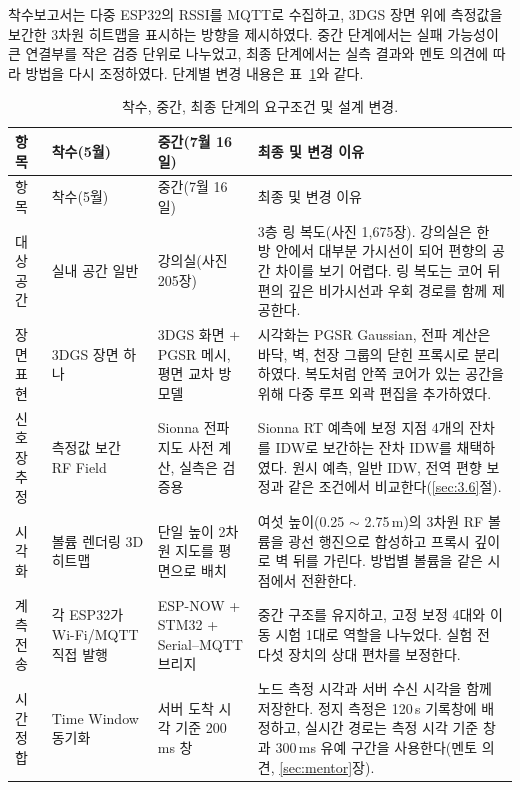 \documentclass[11pt,a4paper]{article}
\begin{document}
착수보고서는 다중 ESP32의 RSSI를 MQTT로 수집하고, 3DGS 장면 위에 측정값을 보간한 3차원 히트맵을 표시하는 방향을
제시하였다. 중간 단계에서는 실패 가능성이 큰 연결부를 작은 검증 단위로 나누었고, 최종 단계에서는 실측 결과와 멘토 의견에
따라 방법을 다시 조정하였다. 단계별 변경 내용은 표~\ref{tab:req-change}와 같다.

{\small
\renewcommand{\arraystretch}{1.2}
\begin{longtable}{@{}>{\raggedright\arraybackslash}p{1.7cm}
  >{\raggedright\arraybackslash}p{3.0cm}
  >{\raggedright\arraybackslash}p{3.4cm}
  >{\raggedright\arraybackslash}p{6.5cm}@{}}
\caption{착수, 중간, 최종 단계의 요구조건 및 설계 변경.}\label{tab:req-change}\\
\toprule
항목 & 착수(5월) & 중간(7월 16일) & 최종 및 변경 이유 \\
\midrule
\endfirsthead
\toprule
항목 & 착수(5월) & 중간(7월 16일) & 최종 및 변경 이유 \\
\midrule
\endhead
\bottomrule
\endfoot
대상 공간 & 실내 공간 일반 & 강의실(사진 205장) &
3층 링 복도(사진 1,675장). 강의실은 한 방 안에서 대부분 가시선이 되어 편향의 공간 차이를 보기 어렵다. 링 복도는
코어 뒤편의 깊은 비가시선과 우회 경로를 함께 제공한다. \\
\midrule
장면 표현 & 3DGS 장면 하나 & 3DGS 화면 + PGSR 메시, 평면 교차 방 모델 &
시각화는 PGSR Gaussian, 전파 계산은 바닥, 벽, 천장 그룹의 닫힌 프록시로 분리하였다. 복도처럼 안쪽 코어가 있는 공간을
위해 다중 루프 외곽 편집을 추가하였다. \\
\midrule
신호장 추정 & 측정값 보간 RF Field & Sionna 전파 지도 사전 계산, 실측은 검증용 &
Sionna RT 예측에 보정 지점 4개의 잔차를 IDW로 보간하는 잔차 IDW를 채택하였다. 원시 예측, 일반 IDW, 전역 편향 보정과
같은 조건에서 비교한다(\ref{sec:3.6}절). \\
\midrule
시각화 & 볼륨 렌더링 3D 히트맵 & 단일 높이 2차원 지도를 평면으로 배치 &
여섯 높이(0.25 $\sim$ 2.75\,m)의 3차원 RF 볼륨을 광선 행진으로 합성하고 프록시 깊이로 벽 뒤를 가린다. 방법별 볼륨을 같은
시점에서 전환한다. \\
\midrule
계측 전송 & 각 ESP32가 Wi-Fi/MQTT 직접 발행 & ESP-NOW + STM32 + Serial--MQTT 브리지 &
중간 구조를 유지하고, 고정 보정 4대와 이동 시험 1대로 역할을 나누었다. 실험 전 다섯 장치의 상대 편차를 보정한다. \\
\midrule
시간 정합 & Time Window 동기화 & 서버 도착 시각 기준 200\,ms 창 &
노드 측정 시각과 서버 수신 시각을 함께 저장한다. 정지 측정은 120\,s 기록창에 배정하고, 실시간 경로는 측정 시각 기준
창과 300\,ms 유예 구간을 사용한다(멘토 의견, \ref{sec:mentor}장). \\

\end{longtable}}
\end{document}
